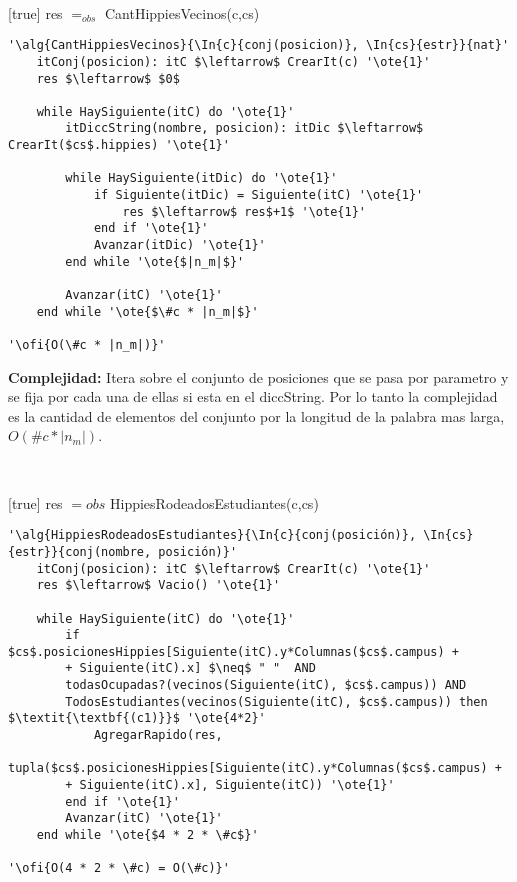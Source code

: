~


[true]
{res $=_{obs}$ CantHippiesVecinos(c,cs)}

\begin{lstlisting}[mathescape]
'\alg{CantHippiesVecinos}{\In{c}{conj(posicion)}, \In{cs}{estr}}{nat}'
	itConj(posicion): itC $\leftarrow$ CrearIt(c) '\ote{1}'
	res $\leftarrow$ $0$

	while HaySiguiente(itC) do '\ote{1}'
		itDiccString(nombre, posicion): itDic $\leftarrow$ CrearIt($cs$.hippies) '\ote{1}'

		while HaySiguiente(itDic) do '\ote{1}'
			if Siguiente(itDic) = Siguiente(itC) '\ote{1}'
				res $\leftarrow$ res$+1$ '\ote{1}'
			end if '\ote{1}'
			Avanzar(itDic) '\ote{1}'
		end while '\ote{$|n_m|$}'

		Avanzar(itC) '\ote{1}'
	end while '\ote{$\#c * |n_m|$}'

'\ofi{O(\#c * |n_m|)}'
\end{lstlisting}

\textbf{Complejidad:} Itera sobre el conjunto de posiciones que se pasa por parametro y se fija por cada una de ellas si esta en el diccString. Por lo tanto la complejidad es la cantidad de elementos del conjunto por la longitud de la palabra mas larga, $O(\#c * |n_m|)$.

~


[true]
{res $={obs}$ HippiesRodeadosEstudiantes(c,cs)}

\begin{lstlisting}[mathescape]
'\alg{HippiesRodeadosEstudiantes}{\In{c}{conj(posición)}, \In{cs}{estr}}{conj(nombre, posición)}'
	itConj(posicion): itC $\leftarrow$ CrearIt(c) '\ote{1}'
	res $\leftarrow$ Vacio() '\ote{1}'

	while HaySiguiente(itC) do '\ote{1}'
		if $cs$.posicionesHippies[Siguiente(itC).y*Columnas($cs$.campus) +
		+ Siguiente(itC).x] $\neq$ " "  AND
		todasOcupadas?(vecinos(Siguiente(itC), $cs$.campus)) AND
		TodosEstudiantes(vecinos(Siguiente(itC), $cs$.campus)) then $\textit{\textbf{(c1)}}$ '\ote{4*2}'
			AgregarRapido(res,
				tupla($cs$.posicionesHippies[Siguiente(itC).y*Columnas($cs$.campus) +
		+ Siguiente(itC).x], Siguiente(itC)) '\ote{1}'
		end if '\ote{1}'
		Avanzar(itC) '\ote{1}'
	end while '\ote{$4 * 2 * \#c$}'

'\ofi{O(4 * 2 * \#c) = O(\#c)}'
\end{lstlisting}

